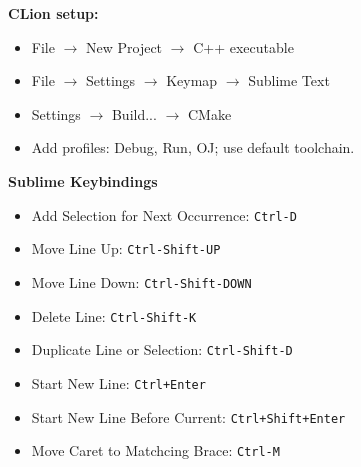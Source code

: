 \textbf{CLion setup:}
\begin{itemize}
  \item File $\rightarrow$ New Project $\rightarrow$ C++ executable
  \item File $\rightarrow$ Settings $\rightarrow$ Keymap $\rightarrow$ Sublime Text
  \item Settings $\rightarrow$ Build... $\rightarrow$ CMake
  \item Add profiles: Debug, Run, OJ; use default toolchain.
\end{itemize}

\textbf{Sublime Keybindings}
\begin{itemize}
  \item Add Selection for Next Occurrence: \texttt{Ctrl-D}
  \item Move Line Up: \texttt{Ctrl-Shift-UP}
  \item Move Line Down: \texttt{Ctrl-Shift-DOWN}
  \item Delete Line: \texttt{Ctrl-Shift-K}
  \item Duplicate Line or Selection: \texttt{Ctrl-Shift-D}
  \item Start New Line: \texttt{Ctrl+Enter}
  \item Start New Line Before Current: \texttt{Ctrl+Shift+Enter}
  \item Move Caret to Matchcing Brace: \texttt{Ctrl-M}
\end{itemize}
